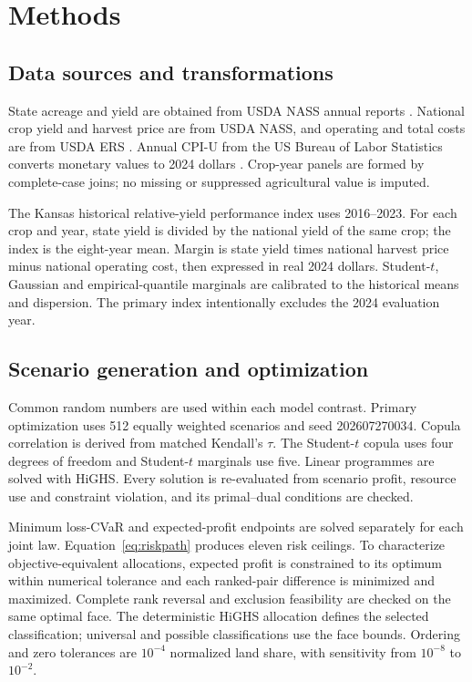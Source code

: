\section{Methods}

\subsection{Data sources and transformations}

State acreage and yield are obtained from USDA NASS annual reports
\citep{usdanass2019crop,usdanass2022crop,usdanass2025crop}. National crop
yield and harvest price are from USDA NASS, and operating and total costs are
from USDA ERS \citep{usdaers2026costs}. Annual CPI-U from the US Bureau of
Labor Statistics converts monetary values to 2024 dollars
\citep{bls2026cpi}. Crop-year panels are formed by complete-case joins; no
missing or suppressed agricultural value is imputed.

The Kansas historical relative-yield performance index uses 2016--2023. For
each crop and year, state yield is divided by the national yield of the same
crop; the index is the eight-year mean. Margin is state yield times national
harvest price minus national
operating cost, then expressed in real 2024 dollars. Student-\(t\), Gaussian
and empirical-quantile marginals are calibrated to the historical means and
dispersion. The primary index intentionally excludes the 2024 evaluation
year.

\subsection{Scenario generation and optimization}

Common random numbers are used within each model contrast. Primary
optimization uses 512 equally weighted scenarios and seed 202607270034.
Copula correlation is derived from matched Kendall's \(\tau\). The
Student-\(t\) copula uses four degrees of freedom and Student-\(t\) marginals
use five. Linear programmes are solved with HiGHS. Every solution is
re-evaluated from scenario profit, resource use and constraint violation, and
its primal--dual conditions are checked.

Minimum loss-CVaR and expected-profit endpoints are solved separately for each
joint law. Equation~\ref{eq:riskpath} produces eleven risk ceilings. To
characterize objective-equivalent allocations, expected profit is constrained
to its optimum within numerical tolerance and each ranked-pair difference is
minimized and maximized. Complete rank reversal and exclusion feasibility are checked
on the same optimal face. The deterministic HiGHS allocation defines the
selected classification; universal and possible classifications use the face
bounds. Ordering and zero tolerances are \(10^{-4}\) normalized land share,
with sensitivity from \(10^{-8}\) to \(10^{-2}\).

